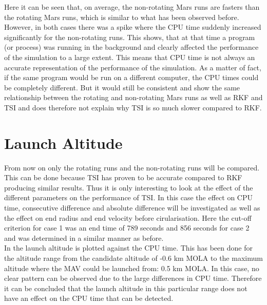 \noindent
Here it can be seen that, on average, the non-rotating Mars runs are fasters than the rotating Mars runs, which is similar to what has been observed before. However, in both cases there was a spike where the CPU time suddenly increased significantly for the non-rotating runs. This shows, that at that time a program (or process) was running in the background and clearly affected the performance of the simulation to a large extent. This means that CPU time is not always an accurate representation of the performance of the simulation. As a matter of fact, if the same program would be run on a different computer, the CPU times could be completely different. But it would still be consistent and show the same relationship between the rotating and non-rotating Mars runs as well as \ac{RKF} and \ac{TSI} and does therefore not explain why \ac{TSI} is so much slower compared to \ac{RKF}.




\section{Launch Altitude}
\label{sec:launchAltitude}
From now on only the rotating runs and the non-rotating runs will be compared. This can be done because \ac{TSI} has proven to be accurate compared to \ac{RKF} producing similar results. Thus it is only interesting to look at the effect of the different parameters on the performance of \ac{TSI}. In this case the effect on CPU time, consecutive difference and absolute difference will be investigated as well as the effect on end radius and end velocity before cirularisation. Here the cut-off criterion for case 1 was an end time of 789 seconds and 856 seconds for case 2 and was determined in a similar manner as before.\\

\noindent
In  the launch altitude is plotted against the CPU time. This has been done for the altitude range from the candidate altitude of -0.6 km \ac{MOLA} to the maximum altitude where the \ac{MAV} could be launched from: 0.5 km \ac{MOLA}. In this case, no clear pattern can be observed due to the large differences in CPU time. Therefore it can be concluded that the launch altitude in this particular range does not have an effect on the CPU time that can be detected.


